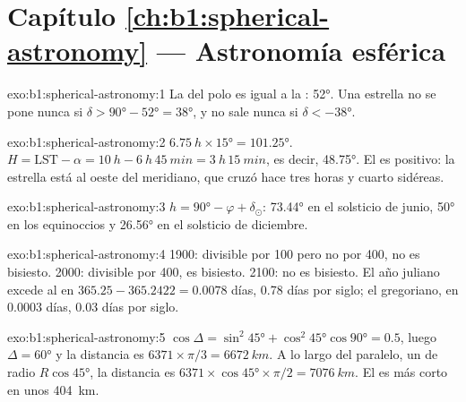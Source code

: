 \section*{Capítulo \ref{ch:b1:spherical-astronomy} --- Astronomía esférica}

\begin{solution}{exo:b1:spherical-astronomy:1}
La  del polo es igual a la : \ang{52}. Una estrella no se pone nunca
si $\delta > \ang{90} - \ang{52} = \ang{38}$, y no sale nunca si
$\delta < \ang{-38}$.
\end{solution}

\begin{solution}{exo:b1:spherical-astronomy:2}
$\qty{6.75}{h}\times\ang{15} = \ang{101.25}$. $H = \mathrm{LST} - \alpha =
\qty{10}{h} - \qty{6}{h}\,\qty{45}{min} = \qty{3}{h}\,\qty{15}{min}$, es decir,
\ang{48.75}. El  es positivo: la estrella está al oeste del
meridiano, que cruzó hace tres horas y cuarto sidéreas.
\end{solution}

\begin{solution}{exo:b1:spherical-astronomy:3}
$h = \ang{90} - \varphi + \delta_\odot$: \ang{73.44} en el solsticio de junio,
\ang{50} en los equinoccios y \ang{26.56} en el solsticio de diciembre.
\end{solution}

\begin{solution}{exo:b1:spherical-astronomy:4}
1900: divisible por 100 pero no por 400, no es bisiesto. 2000: divisible por 400,
es bisiesto. 2100: no es bisiesto. El año juliano excede al  en
$365.25 - 365.2422 = 0.0078$ días, \num{0.78} días por siglo; el gregoriano, en
$0.0003$ días, \num{0.03} días por siglo.
\end{solution}

\begin{solution}{exo:b1:spherical-astronomy:5}
$\cos\Delta = \sin^2\ang{45} + \cos^2\ang{45}\cos\ang{90} = 0.5$, luego
$\Delta = \ang{60}$ y la distancia es $6371\times\pi/3 = \qty{6672}{km}$. A lo largo
del paralelo, un  de radio $R\cos\ang{45}$, la distancia es
$6371\times\cos\ang{45}\times\pi/2 = \qty{7076}{km}$. El  es más
corto en unos \qty{404}{km}.
\end{solution}

